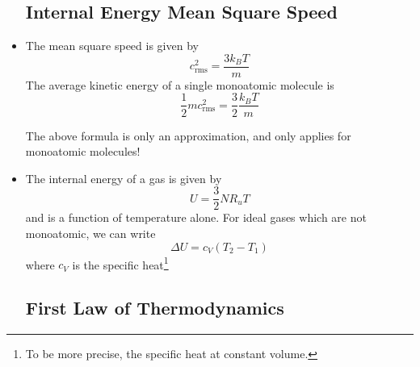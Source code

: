 \begin{itemize}
          \subsection{Internal Energy Mean Square Speed}
    \item The mean square speed is given by
          \begin{equation}
              c_\text{rms}^2 = \frac{3k_BT}{m}
          \end{equation}
          The average kinetic energy of a single monoatomic molecule is
          \begin{equation}
              \frac{1}{2}mc_\text{rms}^2 = \frac{3}{2}\frac{k_BT}{m}
          \end{equation}
          \begin{warning}
              The above formula is only an approximation, and only applies for monoatomic molecules!
          \end{warning}
    \item The internal energy of a gas is given by
          \begin{equation}
              U = \frac{3}{2}NR_uT
          \end{equation}
          and is a function of temperature alone. For ideal gases which are not monoatomic, we can write
          \begin{equation}
              \Delta U = c_V(T_2-T_1)
          \end{equation}
          where $c_V$ is the specific heat\footnote{To be more precise, the specific heat at constant volume.}

          \subsection{First Law of Thermodynamics}


\end{itemize}
